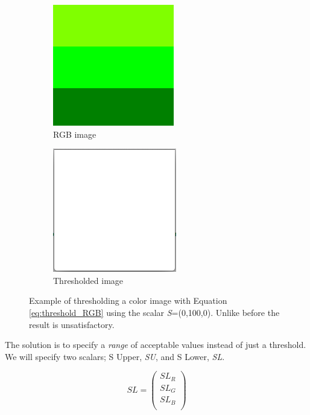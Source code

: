 \begin{figure}
        \centering
        \begin{subfigure}[b]{0.3\textwidth}
                \includegraphics[scale=0.5]{img/green}
                \caption{RGB image}
        \end{subfigure}
		\quad
        \begin{subfigure}[b]{0.3\textwidth}
                \includegraphics[scale=0.5]{img/simpleRGBThresh}
                \caption{Thresholded image}
        \end{subfigure}
		\caption{Example of thresholding a color image with Equation \ref{eq:threshold_RGB} using the scalar \textit{S}=(0,100,0). Unlike before the result is unsatisfactory.}
		\label{fig:green_fail}
\end{figure}

The solution is to specify a \textit{range} of acceptable values instead of just a threshold. We will specify two scalars; S Upper, \textit{SU}, and S Lower, \textit{SL}.

\begin{equation}
SL =  
\begin{pmatrix}
  SL_{R}\\
  SL_{G}\\
  SL_{B}\\
\end{pmatrix}
\label{eq:thresholdlower}
\end{equation}

